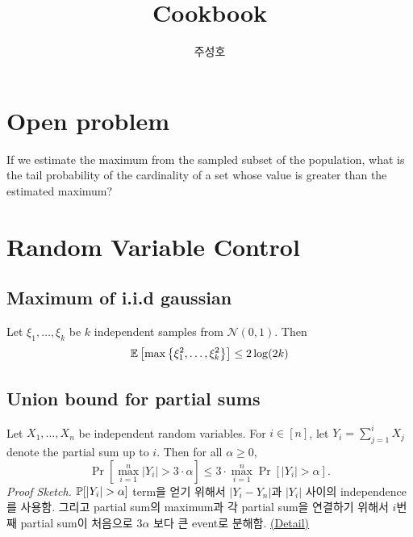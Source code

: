 \documentclass[10pt]{article}
\title{Cookbook}
\date{}
\author{주성호}
\begin{document}
\thispagestyle{plain}
\cfoot{\thepage}
\maketitle
{\sffamily\tableofcontents}
\newpage

\section*{Open problem}
\begin{ginzabox}
If we estimate the maximum from the sampled subset of the population, what is the tail probability of the cardinality of a set whose value is greater than the estimated maximum?

\vspace*{4mm}

{\scriptsize {}}
\end{ginzabox}
\section{Random Variable Control}
\subsection{Maximum of i.i.d gaussian} 
Let $\xi_1, \dots, \xi_k$ be $k$ independent samples from $\mathcal{N}(0,1)$. Then 
\begin{equation}
    \mathop{\mathbb{E} \displaystyle} \left[ \max \left\{ \xi_1^2, \dots, \xi_k^2 \right\} \right] \leq 2 \log (2k)
\end{equation}
\subsection{Union bound for partial sums}  
Let $X_1, \dots, X_n$ be independent random variables. For $i \in [n]$, let $Y_i = \sum_{j=1}^i X_j$ denote the partial sum up to $i$. Then for all $\alpha \geq 0$, 
\begin{equation}
    \Pr [\max_{i=1}^n |Y_i| > 3 \cdot \alpha] \leq 3 \cdot \max_{i=1}^n \Pr [|Y_i| > \alpha]. 
\end{equation}
\emph{Proof Sketch.} $\mathbb{P}[|Y_i| > \alpha]$ term을 얻기 위해서 $|Y_i-Y_n|$과 $|Y_i|$ 사이의 independence를 사용함. 그리고 partial sum의 maximum과 각 partial sum을 연결하기 위해서 $i$번 째 partial sum이 처음으로 $3 \alpha$ 보다 큰 event로 분해함. \href{https://x.com/shortstein/status/1584879368597213185/photo/1}{(Detail)} 
\end{document}
